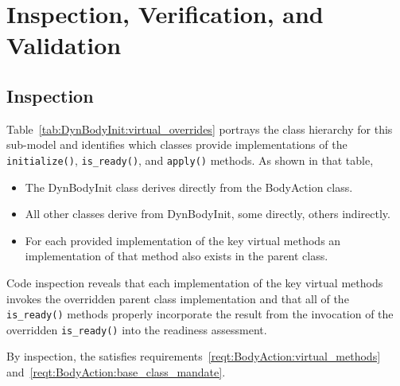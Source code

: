 %

\chapter{Inspection, Verification, and Validation}\label{ch:\modelpartid:ivv}
\section{Inspection}\label{sec:DynBodyInit:inspect}

\label{inspect:DynBodyInit:design}
Table~\ref{tab:DynBodyInit:virtual_overrides}
portrays the class hierarchy for this sub-model
and identifies which classes provide implementations of the
{\tt initialize()}, {\tt is\_ready()}, and {\tt apply()} methods.
As shown in that table,\begin{itemize}
\item The DynBodyInit class derives directly from the BodyAction class.
\item All other \partxname classes derive from DynBodyInit, some directly,
others indirectly.
\item For each provided implementation of the key virtual methods
an implementation of that method also exists in the parent class.
\end{itemize}
Code inspection reveals that each implementation of the key virtual methods
invokes the overridden parent class implementation and that
all of the {\tt is\_ready()} methods properly incorporate the result from
the invocation of the overridden {\tt is\_ready()} into the readiness
assessment.

By inspection, the \partxname satisfies
requirements~\ref{reqt:BodyAction:virtual_methods}
and~\ref{reqt:BodyAction:base_class_mandate}.


